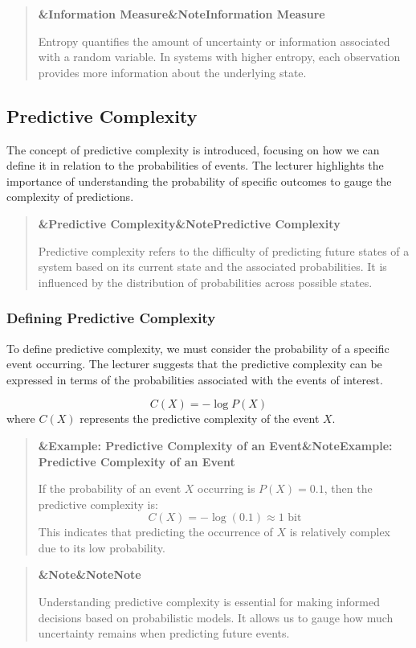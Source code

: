 \documentclass[a4paper]{article}
\newcommand{\boxheading}[1]{%
  \par\smallskip
  \noindent\textbf{\ifx&#1&Note\else#1\fi}\par
  \smallskip
}
\newenvironment{defbox}[1][]{%
  \begin{quote}\color{green!40!black}\boxheading{#1}\normalcolor
}{\end{quote}}
\newenvironment{exbox}[1][]{%
  \begin{quote}\color{brown!70!black}\boxheading{#1}\normalcolor
}{\end{quote}}
\newenvironment{rembox}[1][]{%
  \begin{quote}\color{black!70}\boxheading{#1}\normalcolor
}{\end{quote}}
\begin{document}
\begin{rembox}[Information Measure]
Entropy quantifies the amount of uncertainty or information associated with a random variable. In systems with higher entropy, each observation provides more information about the underlying state.
\end{rembox}

\subsection{Predictive Complexity}
The concept of predictive complexity is introduced, focusing on how we can define it in relation to the probabilities of events. The lecturer highlights the importance of understanding the probability of specific outcomes to gauge the complexity of predictions.

\begin{defbox}[Predictive Complexity]
Predictive complexity refers to the difficulty of predicting future states of a system based on its current state and the associated probabilities. It is influenced by the distribution of probabilities across possible states.
\end{defbox}

\subsubsection{Defining Predictive Complexity}
To define predictive complexity, we must consider the probability of a specific event occurring. The lecturer suggests that the predictive complexity can be expressed in terms of the probabilities associated with the events of interest.

\begin{equation}
C(X) = -\log P(X)
\end{equation}
where \( C(X) \) represents the predictive complexity of the event \( X \).

\begin{exbox}[Example: Predictive Complexity of an Event]
If the probability of an event \( X \) occurring is \( P(X) = 0.1 \), then the predictive complexity is:
\[
C(X) = -\log(0.1) \approx 1 \text{ bit}
\]
This indicates that predicting the occurrence of \( X \) is relatively complex due to its low probability.
\end{exbox}

\begin{rembox}[Note]
Understanding predictive complexity is essential for making informed decisions based on probabilistic models. It allows us to gauge how much uncertainty remains when predicting future events.
\end{rembox}
\end{document}
